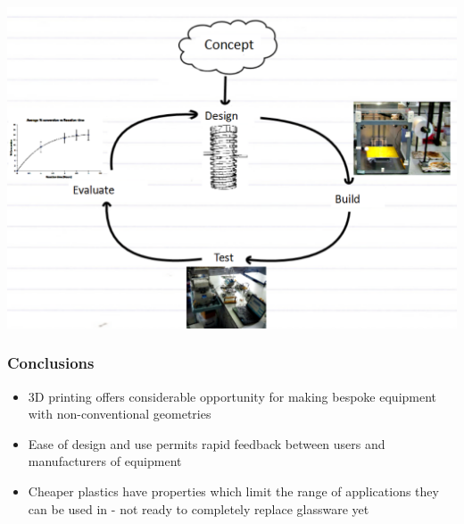 \documentclass[10pt, compress]{beamer}
\begin{document}
\begin{frame}
\begin{center}
\includegraphics[width=\textwidth]{iter2.PNG}
\end{center}
\end{frame}

\begin{frame}
\frametitle{Conclusions}

\begin{itemize}
    \item{3D printing offers considerable opportunity for making bespoke equipment with non-conventional geometries}
    \item{Ease of design and use permits rapid feedback between users and manufacturers of equipment}
    \item{Cheaper plastics have properties which limit the range of applications they can be used in - not ready to completely replace glassware yet}
\end{itemize}
\end{frame}
\end{document}

